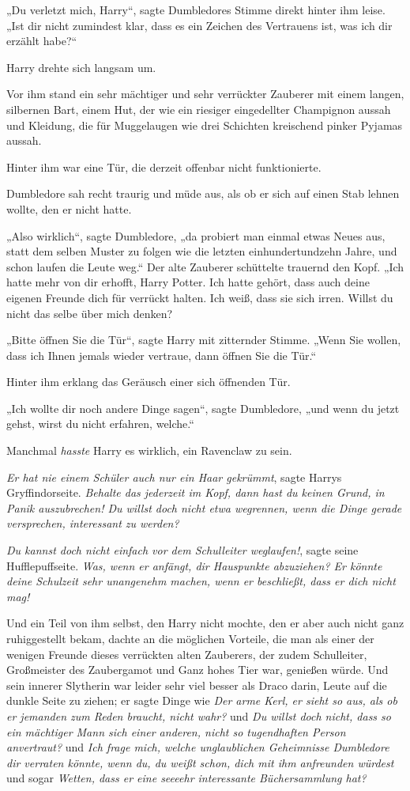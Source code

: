 {„Du verletzt mich, Harry“, sagte Dumbledores Stimme direkt hinter ihm leise. „Ist dir nicht zumindest klar, dass es ein Zeichen des Vertrauens ist, was ich dir erzählt habe?“

Harry drehte sich langsam um.

Vor ihm stand ein sehr mächtiger und sehr verrückter Zauberer mit einem langen, silbernen Bart, einem Hut, der wie ein riesiger eingedellter Champignon aussah und Kleidung, die für Muggelaugen wie drei Schichten kreischend pinker Pyjamas aussah.

Hinter ihm war eine Tür, die derzeit offenbar nicht funktionierte.

Dumbledore sah recht traurig und müde aus, als ob er sich auf einen Stab lehnen wollte, den er nicht hatte.

„Also wirklich“, sagte Dumbledore, „da probiert man einmal etwas Neues aus, statt dem selben Muster zu folgen wie die letzten einhundertundzehn Jahre, und schon laufen die Leute weg.“ Der alte Zauberer schüttelte trauernd den Kopf. „Ich hatte mehr von dir erhofft, Harry Potter. Ich hatte gehört, dass auch deine eigenen Freunde dich für verrückt halten. Ich weiß, dass sie sich irren. Willst du nicht das selbe über mich denken?

„Bitte öffnen Sie die Tür“, sagte Harry mit zitternder Stimme. „Wenn Sie wollen, dass ich Ihnen jemals wieder vertraue, dann öffnen Sie die Tür.“

Hinter ihm erklang das Geräusch einer sich öffnenden Tür.

„Ich wollte dir noch andere Dinge sagen“, sagte Dumbledore, „und wenn du jetzt gehst, wirst du nicht erfahren, welche.“

Manchmal \emph{hasste} Harry es wirklich, ein Ravenclaw zu sein.

\emph{Er hat nie einem Schüler auch nur ein Haar gekrümmt}, sagte Harrys Gryffindorseite. \emph{Behalte das jederzeit im Kopf, dann hast du keinen Grund, in Panik auszubrechen! Du willst doch nicht etwa wegrennen, wenn die Dinge gerade versprechen, interessant zu werden?}

\emph{Du kannst doch nicht einfach vor dem Schulleiter weglaufen!}, sagte seine Hufflepuffseite. \emph{Was, wenn er anfängt, dir Hauspunkte abzuziehen? Er könnte deine Schulzeit sehr unangenehm machen, wenn er beschließt, dass er dich nicht mag!}

Und ein Teil von ihm selbst, den Harry nicht mochte, den er aber auch nicht ganz ruhiggestellt bekam, dachte an die möglichen Vorteile, die man als einer der wenigen Freunde dieses verrückten alten Zauberers, der zudem Schulleiter, Großmeister des Zaubergamot und Ganz hohes Tier war, genießen würde. Und sein innerer Slytherin war leider sehr viel besser als Draco darin, Leute auf die dunkle Seite zu ziehen; er sagte Dinge wie \emph{Der arme Kerl, er sieht so aus, als ob er jemanden zum Reden braucht, nicht wahr?} und \emph{Du willst doch nicht, dass so ein mächtiger Mann sich einer anderen, nicht so tugendhaften Person anvertraut?} und \emph{Ich frage mich, welche unglaublichen Geheimnisse Dumbledore dir verraten könnte, wenn du, du weißt schon, dich mit ihm anfreunden würdest} und sogar \emph{Wetten, dass er eine seeeehr interessante Büchersammlung hat?}

}
